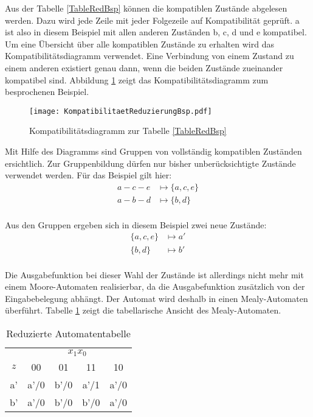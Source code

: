 Aus der Tabelle \ref{TableRedBsp} können die kompatiblen Zustände abgelesen werden. Dazu wird jede Zeile mit jeder Folgezeile auf Kompatibilität geprüft. a ist also in diesem Beispiel mit allen anderen Zuständen b, c, d und e kompatibel. Um eine Übersicht über alle kompatiblen Zustände zu erhalten wird das Kompatibilitätsdiagramm verwendet. Eine Verbindung von einem Zustand zu einem anderen existiert genau dann, wenn die beiden Zustände zueinander kompatibel sind. Abbildung \ref{KomRedBsp} zeigt das Kompatibilitätsdiagramm zum besprochenen Beispiel.

\begin{figure}[htp]
	\centering
	\texttt{[image: KompatibilitaetReduzierungBsp.pdf]}
	\caption{Kompatibilitätsdiagramm zur Tabelle \ref{TableRedBsp}}
	\label{KomRedBsp}
\end{figure}

Mit Hilfe des Diagramms sind Gruppen von vollständig kompatiblen Zuständen ersichtlich. Zur Gruppenbildung dürfen nur bisher unberücksichtigte Zustände verwendet werden. Für das Beispiel gilt hier:
\begin{align*}
	a-c-e &\mapsto \{a,c,e\} \\
	a-b-d &\mapsto \{b,d\} \\
\end{align*}

Aus den Gruppen ergeben sich in diesem Beispiel zwei neue Zustände:
\begin{align*}
	\{a,c,e\} &\mapsto a' \\
	\{b,d\} &\mapsto b' \\
\end{align*}

Die Ausgabefunktion bei dieser Wahl der Zustände ist allerdings nicht mehr mit einem Moore-Automaten realisierbar, da die Ausgabefunktion zusätzlich von der Eingabebelegung abhängt. Der Automat wird deshalb in einen Mealy-Automaten überführt. Tabelle \ref{TableRedBspRed} zeigt die tabellarische Ansicht des Mealy-Automaten.
\begin{table}[htp]
\centering
\begin{tabular}{c|cccc}
 & \multicolumn{4}{|c}{$x_1x_0$}\\
$z$ & 00 & 01 & 11 & 10\\ \hline
a' & a'/0 & b'/0 & a'/1 & a'/0\\
b' & a'/0 & b'/0 & b'/0 & a'/0\\
\end{tabular}
\caption{Reduzierte Automatentabelle}
\label{TableRedBspRed}
\end{table}



  

